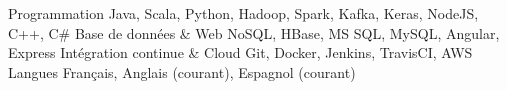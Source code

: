 \begin{cvskills}
	\cvskill
	{Programmation}
	{Java, Scala, Python, Hadoop, Spark, Kafka, Keras, NodeJS, C++, C\#}
	\cvskill
	{Base de données \& Web}
	{NoSQL, HBase, MS SQL, MySQL, Angular, Express}
	\cvskill
	{Intégration continue \& Cloud}
	{Git, Docker, Jenkins, TravisCI, AWS}
	\cvskill
	{Langues}
	{Français, Anglais (courant), Espagnol (courant)}
\end{cvskills}